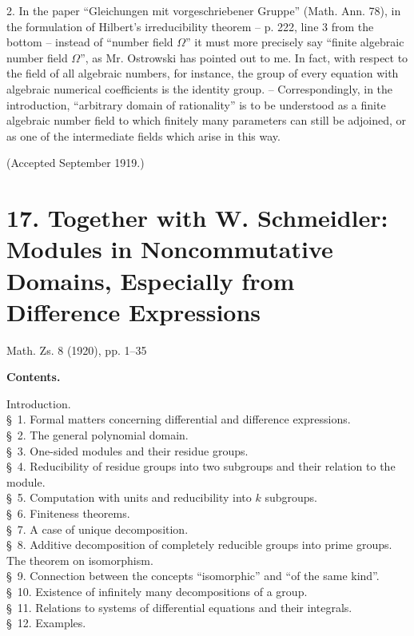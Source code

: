 \documentclass[11pt]{article}
\begin{document}
2. In the paper ``Gleichungen mit vorgeschriebener Gruppe'' (Math. Ann. 78), in the formulation of Hilbert's irreducibility theorem -- p. 222, line 3 from the bottom -- instead of ``number field $\Omega$'' it must more precisely say ``finite algebraic number field $\Omega$'', as Mr. Ostrowski has pointed out to me. In fact, with respect to the field of all algebraic numbers, for instance, the group of every equation with algebraic numerical coefficients is the identity group. -- Correspondingly, in the introduction, ``arbitrary domain of rationality'' is to be understood as a finite algebraic number field to which finitely many parameters can still be adjoined, or as one of the intermediate fields which arise in this way.

\begin{center}
(Accepted September 1919.)
\end{center}

\clearpage
\setcounter{footnote}{0}
\section*{17. Together with W. Schmeidler: Modules in Noncommutative Domains, Especially from Difference Expressions}
\begin{center}
Math. Zs. 8 (1920), pp. 1--35
\end{center}

\begin{center}
\textbf{Contents.}
\end{center}
\begin{center}
\begin{minipage}{0.82\linewidth}
Introduction.\\
\S~1. Formal matters concerning differential and difference expressions.\\
\S~2. The general polynomial domain.\\
\S~3. One-sided modules and their residue groups.\\
\S~4. Reducibility of residue groups into two subgroups and their relation to the module.\\
\S~5. Computation with units and reducibility into $k$ subgroups.\\
\S~6. Finiteness theorems.\\
\S~7. A case of unique decomposition.\\
\S~8. Additive decomposition of completely reducible groups into prime groups. The theorem on isomorphism.\\
\S~9. Connection between the concepts ``isomorphic'' and ``of the same kind''.\\
\S~10. Existence of infinitely many decompositions of a group.\\
\S~11. Relations to systems of differential equations and their integrals.\\
\S~12. Examples.
\end{minipage}
\end{center}
\end{document}
